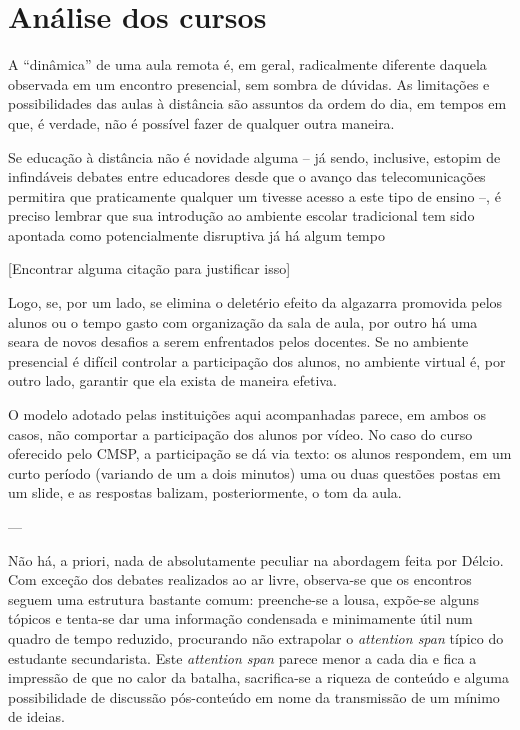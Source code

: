 \documentclass[12pt,a4paper]{article}
\begin{document}
	\newpage
		
	\section{Análise dos cursos}
	
	A “dinâmica” de uma aula remota é, em geral, radicalmente diferente 
	daquela observada em um encontro presencial, sem sombra de dúvidas. 
	As limitações e possibilidades das aulas à distância são assuntos da 
	ordem do dia, em tempos em que, é verdade, não é possível fazer de 
	qualquer outra maneira.

	Se educação à distância não é novidade alguma -- já sendo, inclusive, 
	estopim de infindáveis debates entre educadores desde que o avanço das 
	telecomunicações permitira que praticamente qualquer um tivesse acesso 
	a este tipo de ensino --, é preciso lembrar que sua introdução ao 
	ambiente escolar tradicional tem sido apontada como potencialmente 
	disruptiva já há algum tempo

	[Encontrar alguma citação para justificar isso]

	Logo, se, por um lado, se elimina o deletério efeito da algazarra 
	promovida pelos alunos ou o tempo gasto com organização da sala de 
	aula, por outro há uma seara de novos desafios a serem enfrentados 
	pelos docentes. Se no ambiente presencial é difícil controlar a 
	participação dos alunos, no ambiente virtual é, por outro lado, 
	garantir que ela exista de maneira efetiva. 

	O modelo adotado pelas instituições aqui acompanhadas  
	parece, em ambos os casos, não comportar a participação dos alunos por 
	vídeo. No caso do curso oferecido pelo CMSP, a participação se dá via 
	texto: os alunos respondem, em um curto período (variando de um a dois 
	minutos) uma ou duas questões postas em um slide, e as respostas 
	balizam, posteriormente, o tom da aula. 
	


---


	Não há, a priori, nada de absolutamente peculiar na abordagem feita por 
	Délcio. Com exceção dos debates realizados ao ar livre, observa-se que 
	os encontros seguem uma estrutura bastante comum: preenche-se a lousa, 
	expõe-se alguns tópicos e tenta-se dar uma informação condensada e 
	minimamente útil num quadro de tempo reduzido, procurando não extrapolar 
	o \textit{attention span} típico do estudante secundarista. Este 
	\textit{attention span} parece menor a cada dia e fica a impressão de que 
	no calor da batalha, sacrifica-se a riqueza de conteúdo e alguma 
	possibilidade de discussão pós-conteúdo em nome da transmissão de um 
	mínimo de ideias. 
	
\end{document}
